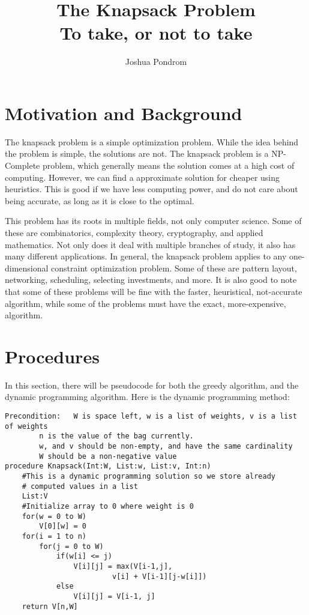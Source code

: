 \documentclass{article}
\begin{document}
\title{The Knapsack Problem\\\large To take, or not to take}
\author{Joshua Pondrom}
\maketitle

\section{Motivation and Background}
The knapsack problem is a simple optimization problem. While the idea behind
the problem is simple, the solutions are not. The knapsack problem is a 
NP-Complete problem, which generally means the solution comes at a high cost
of computing. However, we can find a approximate solution for cheaper using
heuristics. This is good if we have less computing power, and do not care
about being accurate, as long as it is close to the optimal.

This problem has its roots in multiple fields, not only computer science. Some 
of these are combinatorics, complexity theory, cryptography, and applied
mathematics. Not only does it deal with multiple branches of study, it also has
many different applications. In general, the knapsack problem applies to any
one-dimensional constraint optimization problem. Some of these are pattern
layout, networking, scheduling, selecting investments, and more. It is also
good to note that some of these problems will be fine with the faster, 
heuristical, not-accurate algorithm, while some of the problems must have
the exact, more-expensive, algorithm.
\section{Procedures}
In this section, there will be pseudocode for both the greedy algorithm, and the
dynamic programming algorithm. Here is the dynamic programming method:
\newpage
\begin{lstlisting}
Precondition:	W is space left, w is a list of weights, v is a list of weights
		n is the value of the bag currently.
		w, and v should be non-empty, and have the same cardinality
		W should be a non-negative value
procedure Knapsack(Int:W, List:w, List:v, Int:n)
	#This is a dynamic programming solution so we store already
	# computed values in a list
	List:V
	#Initialize array to 0 where weight is 0
	for(w = 0 to W) 
		V[0][w] = 0
	for(i = 1 to n)
		for(j = 0 to W)
			if(w[i] <= j)
				V[i][j] = max(V[i-1,j], 
					     v[i] + V[i-1][j-w[i]])
			else
				V[i][j] = V[i-1, j]
	return V[n,W]
\end{lstlisting}
\end{document}
